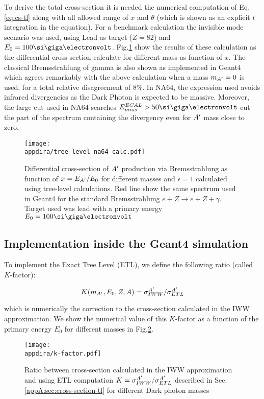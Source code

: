 To derive the total cross-section it is needed the numerical computation of Eq.\ref{eq:cs-tl} along with all allowed range of $x$ and $\theta$ (which is shown as an explicit $t$ integration in the equation). For a benchmark calculation the invisible mode scenario was used, using Lead as target ($Z = 82$) and $E_0 = 100 \gev$. Fig.\ref{fig:dp-cs-tl} show the results of these calculation as the differential cross-section calculate for different mass as function of $x$. The classical Bremsstrahlung of gamma is also shown as implemented in Geant4 which agrees remarkably with the above calculation when a mass $m_{A'} = 0$ is used, for a total relative disagreement of 8\%. In NA64, the expression used avoids infrared divergencies as the Dark Photon is expected to be massive. Moreover, the large cut used in NA64 searches $E^{ECAL}_{miss} > 50 \gev$ cut the part of the spectrum containing the divergency even for $A'$ mass close to zero.

\begin{figure}[bth!]
  \centering
  \texttt{[image: \\appdira/tree-level-na64-calc.pdf]}
  \caption[Tree level differential cross-section for different masses]{Differential cross-section of $A'$ production via Bremsstrahlung as function of $x=E_{A'}/E_0$ for different masses and $\epsilon = 1$ calculated using tree-level calculations. Red line show the same spectrum used in Geant4 for the standard Bremsstrahlung $e + Z \to e + Z + \gamma$. Target used was lead with a primary energy $E_0 = 100 \gev$ \cite{DMsimulation}}
  \label{fig:dp-cs-tl}
\end{figure}

\subsection{Implementation inside the Geant4 simulation}

To implement the Exact Tree Level (ETL), we define the following ratio (called $K$-factor):

\begin{equation}
  \label{eq:k-factor}
  K(m_{A'},E_0,Z,A) = \sigma^{A'}_{IWW} / \sigma^{A'}_{ETL}
\end{equation}

which is numerically the correction to the cross-section calculated in the IWW approximation. We show the numerical value of this $K$-factor as a function of the primary energy $E_0$ for different masses in Fig.\ref{fig:k-factor}.

\begin{figure}[bth!]
  \centering
  \texttt{[image: \\appdira/k-factor.pdf]}
  \caption{Ratio between cross-section calculated in the IWW approximation and using ETL computation $K = \sigma^{A'}_{IWW} / \sigma^{A'}_{ETL}$ described in Sec.\ref{appA:sec:cross-section-tl} for different Dark photon masses \cite{DMsimulation}}
  \label{fig:k-factor}
\end{figure}

